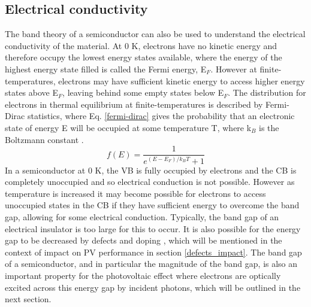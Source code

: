 \documentclass[11pt, twoside]{report}
\begin{document}
\subsection{Electrical conductivity}

The band theory of a semiconductor can also be used to understand the electrical conductivity of the material. At 0 K, electrons have no kinetic energy and therefore occupy the lowest energy states available, where the energy of the highest energy state filled is called the Fermi energy, E$_F$. However at finite-temperatures, electrons may have sufficient kinetic energy to access higher energy states above E$_F$, leaving behind some empty states below E$_F$. The distribution for electrons in thermal equilibrium at finite-temperatures is described by Fermi-Dirac statistics, where Eq. \ref{fermi-dirac} gives the probability that an electronic state of energy E will be occupied at some temperature T, where k$_B$ is the Boltzmann constant \cite{Nelson3}.
\begin{equation}\label{fermi-dirac}
f(E) = \frac{1}{e^{(E-E_F)/k_BT}+1}
\end{equation}
In a semiconductor at 0 K, the VB is fully occupied by electrons and the CB is completely unoccupied and so electrical conduction is not possible. However as temperature is increased it may become possible for electrons to access unoccupied states in the CB if they have sufficient energy to overcome the band gap, allowing for some electrical conduction. Typically, the band gap of an electrical insulator is too large for this to occur. It is also possible for the energy gap to be decreased by defects and doping \cite{Nelson3}, which will be mentioned in the context of impact on PV performance in section \ref{defects_impact}. The band gap of a semiconductor, and in particular the magnitude of the band gap, is also an important property for the photovoltaic effect where electrons are optically excited across this energy gap by incident photons, which will be outlined in the next section.

\end{document}
